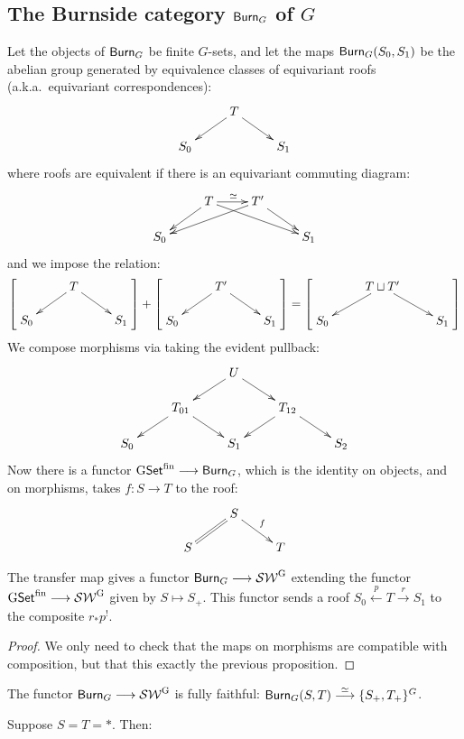 \documentclass[11pt]{article}
\begin{document}
\begin{FirstNineLectures}
\subsection*{The Burnside category $\operatorname{{\mathsf{Burn}}}_G$ of $G$}
Let the objects of $\operatorname{{\mathsf{Burn}}}_G$ be finite $G$-sets, and let the maps $\operatorname{{\mathsf{Burn}}}_G(S_0,S_1)$ be the abelian group generated by equivalence classes of equivariant roofs (a.k.a.\ equivariant correspondences):
\[\xymatrix@R=5mm{&T\ar[dl]\ar[dr]\\S_0&&S_1}\]
where roofs are equivalent if there is an equivariant commuting diagram:
\[\xymatrix@R=5mm{&T\ar[dl]\ar[drr]\ar[r]^\simeq&T'\ar[dll]\ar[dr]
\\S_0&&&S_1}\]
and we impose the relation:
\[
\left[\raisebox{.5cm}[.8cm][0cm] {$\xymatrix@R=5mm{&T\ar[dl]\ar[dr]\\S_0&&S_1}$}\right]
+
\left[\raisebox{.5cm}[.8cm][0cm] {$\xymatrix@R=5mm{&T'\ar[dl]\ar[dr]\\S_0&&S_1}$}\right]
=\left[\raisebox{.5cm}[.8cm][0cm] {$\xymatrix@R=5mm{&T\sqcup T'\ar[dl]\ar[dr]\\S_0&&S_1}$}\right]
\]
We compose morphisms via taking the evident pullback:
\[\xymatrix@R=5mm{
&&U\ar[dl]\ar[dr]\\
&T_{01}\ar[dl]\ar[dr]&&T_{12}\ar[dl]\ar[dr]\\
S_0&&S_1&&S_2
}\]
Now there is a functor $\operatorname{{G\mathsf{Set}^\textup{fin}}}\longrightarrow\operatorname{{\mathsf{Burn}}}_G$, which is the identity on objects, and on morphisms, takes $f:S\to T$ to the roof:
\[\xymatrix@R=5mm{&S\ar@{=}[dl]\ar[dr]^f\\S&&T}\]
\begin{prop*}
The transfer map gives a functor $\operatorname{{\mathsf{Burn}}}_G\longrightarrow\operatorname{{\mathcal{SW}^G}}$ extending the functor $\operatorname{{G\mathsf{Set}^\textup{fin}}}\longrightarrow\operatorname{{\mathcal{SW}^G}}$ given by $S\mapsto S_+$. This functor sends a roof $S_0\overset{p}{\longleftarrow} T\overset{r}{\longrightarrow}S_1$ to the composite $r_* p^!$.
\end{prop*}
\begin{proof}
We only need to check that the maps on morphisms are compatible with composition, but that this exactly the previous proposition.
\end{proof}
\begin{thm*}
The functor $\operatorname{{\mathsf{Burn}}}_G\longrightarrow \operatorname{{\mathcal{SW}^G}}$ is fully faithful: $\operatorname{{\mathsf{Burn}}}_G(S,T)\overset{\simeq}{\longrightarrow}\{S_+,T_+\}^G$.
\end{thm*}
\begin{exmp*}
Suppose $S=T=*$. Then:

\end{exmp*}
\end{FirstNineLectures}
\end{document}
